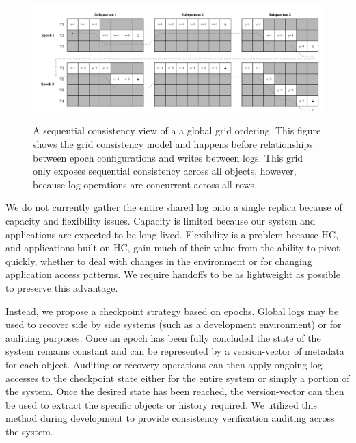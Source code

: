 \begin{landscape}
\begin{figure}
    \begin{center}
        \includegraphics[width=8.2in]{figures/ch03_log_ordering.pdf}
    \end{center}
    \renewcommand{\baselinestretch}{1}
    \small\normalsize

    \begin{quote}
        \caption[Grid Consistency: A Sequential Log Ordering]{A sequential consistency view of a a global grid ordering. This figure shows the grid consistency model and happens before relationships between epoch configurations and writes between logs. This grid only exposes sequential consistency across all objects, however, because log operations are concurrent across all rows.}
        \label{fig:ch03_log_ordering}
    \end{quote}
\end{figure}
\renewcommand{\baselinestretch}{2}
\small\normalsize
\end{landscape}

We do not currently gather the entire shared log onto a single replica because of capacity and flexibility issues.
Capacity is limited because our system and applications are expected to be long-lived.
Flexibility is a problem because HC, and applications built on HC, gain much of their value from the ability to pivot quickly, whether to deal with changes in the environment or for changing application access patterns.
We require handoffs to be as lightweight as possible to preserve this advantage.

Instead, we propose a checkpoint strategy based on epochs.
Global logs may be used to recover side by side systems (such as a development environment) or for auditing purposes.
Once an epoch has been fully concluded the state of the system remains constant and can be represented by a version-vector of metadata for each object.
Auditing or recovery operations can then apply ongoing log accesses to the checkpoint state either for the entire system or simply a portion of the system.
Once the desired state has been reached, the version-vector can then be used to extract the specific objects or history required.
We utilized this method during development to provide consistency verification auditing across the system.

